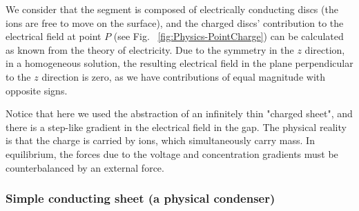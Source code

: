 We consider that the segment is composed of electrically conducting discs (the ions are free to move on the surface), and the charged discs' contribution to the 
electrical field at point $P$ (see Fig.~ \ref{fig:Physics-PointCharge}) can be calculated as known from the 
theory of electricity. Due to the symmetry in the $z$ direction, in a homogeneous solution, the resulting electrical field in the plane perpendicular to the $z$ direction is zero, as we have contributions of equal magnitude with opposite signs.
\else
\fi

\ifx\magyar\undefined

Notice that here we used the abstraction of an infinitely thin "charged sheet", and there is a step-like
gradient in the electrical field in the gap. The physical reality is that the charge is carried by ions, which simultaneously carry mass. In equilibrium, the forces due to the voltage and concentration gradients must be counterbalanced by an external force.
\else

\fi

\ifx\magyar\undefined

\subsubsection{Simple conducting sheet (a physical condenser)\label{sec:Physics-SimpleSheet}}

